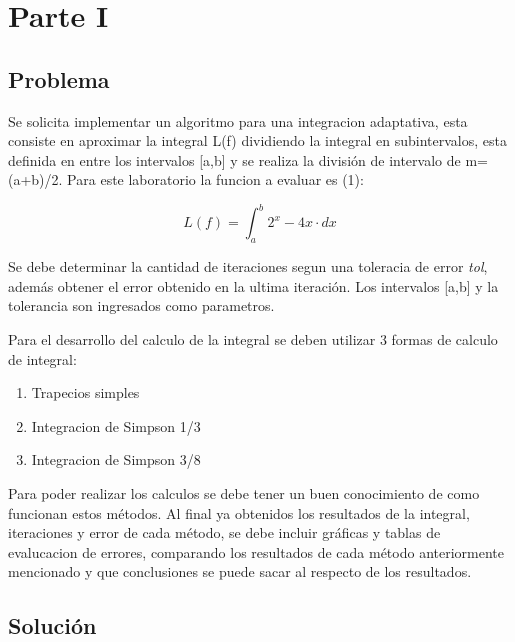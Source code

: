 \section{Parte I}

\subsection{Problema}

\par Se solicita implementar un algoritmo para una integracion adaptativa, esta consiste en aproximar la integral L(f) dividiendo la integral en subintervalos, esta definida en entre los intervalos [a,b] y se realiza la  división de intervalo de m=(a+b)/2. Para este laboratorio la funcion a evaluar es (1):

\begin{equation}
	L(f) = \int_{a}^{b} 2^{x} - 4x\cdot dx
\end{equation}

\par Se debe determinar la cantidad de iteraciones segun una toleracia de error \textit{tol}, además obtener el error obtenido en la ultima iteración. Los intervalos [a,b] y la tolerancia son ingresados como parametros.

\par Para el desarrollo del calculo de la integral se deben utilizar 3 formas de calculo de integral: 

\begin{enumerate}
	\item Trapecios simples
	\item Integracion de Simpson 1/3
	\item Integracion de Simpson 3/8
\end{enumerate}

\par Para poder realizar los calculos se debe tener un buen conocimiento de como funcionan estos métodos. Al final ya obtenidos los resultados de la integral, iteraciones y error de cada método, se debe incluir gráficas y tablas de evalucacion de errores, comparando los resultados de cada método anteriormente mencionado y que conclusiones se puede sacar al respecto de los resultados.

\newpage

\subsection{Solución}

